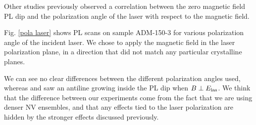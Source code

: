 \documentclass[a4paper,11pt]{report}
\begin{document}
Other studies \citep{anishchik2015low, filimonenko2020weak} previously observed a correlation between the zero magnetic field PL dip and the polarization angle of the laser with respect to the magnetic field. 

Fig. \ref{pola laser} shows PL scans on sample ADM-150-3 for various polarization angle of the incident laser. We chose to apply the magnetic field in the laser polarization plane, in a direction that did not match any particular crystalline planes.

We can see no clear differences between the different polarization angles used, whereas \citep{anishchik2015low} and \citep{filimonenko2020weak} saw an antiline growing inside the PL dip when $B \perp E_{\rm las}$. We think that the difference between our experiments come from the fact that we are using denser NV ensembles, and that any effects tied to the laser polarization are hidden by the stronger effects discussed previously.

\printbibliography
\end{document}
